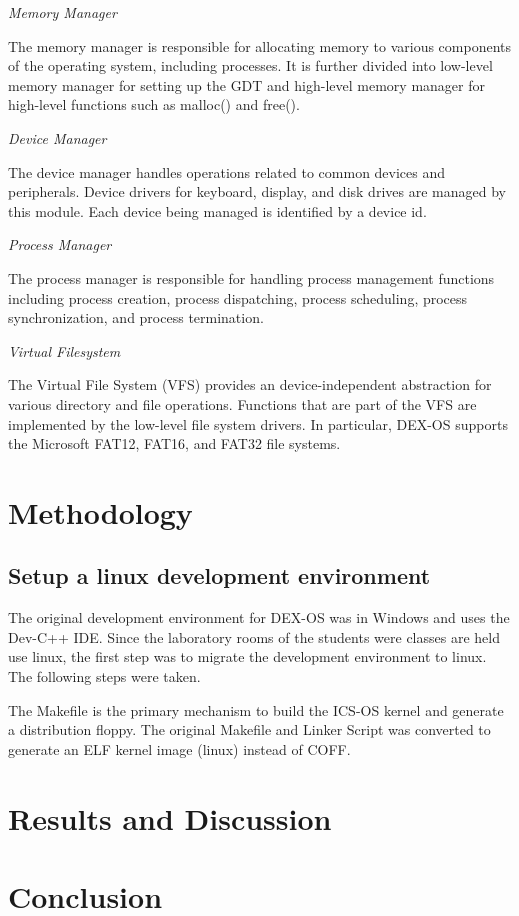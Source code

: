 \documentclass{acm_proc_article-sp}
\begin{document}
\textit{Memory Manager}

The memory manager is responsible for allocating memory to various components
of the operating system, including processes. It is further divided into 
low-level memory manager for setting up the GDT and high-level memory manager
for high-level functions such as malloc() and free().

\textit{Device Manager}

The device manager handles operations related to common devices and peripherals.
Device drivers for keyboard, display, and disk drives are managed by this 
module. Each device being managed is identified by a device id. 

\textit{Process Manager}

The process manager is responsible for handling process management functions
including process creation, process dispatching, process scheduling, process
synchronization, and process termination. 

\textit{Virtual Filesystem}

The Virtual File System (VFS) provides an device-independent abstraction for
various directory and file operations. Functions that are part of the VFS are
implemented by the low-level file system drivers. In particular, DEX-OS 
supports the Microsoft FAT12, FAT16, and FAT32 file systems.

\section{Methodology}

\subsection{Setup a linux development environment}
The original development environment for DEX-OS was in Windows and uses the 
Dev-C++ IDE. Since the laboratory rooms of the students were classes are held
use linux, the first step was to migrate the development environment to 
linux. The following steps were taken.

The Makefile is the primary mechanism to build the ICS-OS kernel and 
generate a distribution floppy. The original Makefile and Linker Script
was converted to generate an ELF kernel image (linux) instead of COFF.


\section{Results and Discussion}

\section{Conclusion}



\balancecolumns
\end{document}
